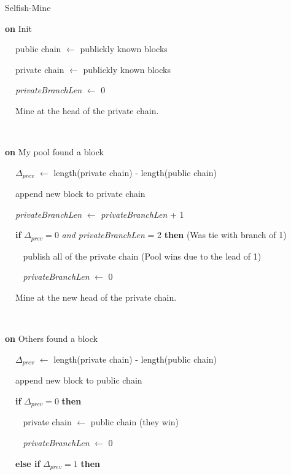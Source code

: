 \documentclass[a4paper, 11pt]{article}
\begin{document}
\begin{CJK*}{UTF8}{gbsn}
    \begin{algorithm}
        \caption{Selfish-Mine}
        \label{algorithm:selfishMine}

        \textbf{on} Init

            $\ \ \ \ $ public chain  $\leftarrow$ publickly known blocks

            $\ \ \ \ $ private chain $\leftarrow$ publickly known blocks

            $\ \ \ \ $ \textit{privateBranchLen} $\leftarrow$ 0

            $\ \ \ \ $ Mine at the head of the private chain.

        $ $
        
        \textbf{on} My pool found a block

            $\ \ \ \ $ $\Delta_{\textit{prev}}$ $\leftarrow$ length(private chain) - length(public chain)

            $\ \ \ \ $ append new block to private chain

            $\ \ \ \ $ \textit{privateBranchLen} $\leftarrow$ \textit{privateBranchLen} + 1

            $\ \ \ \ $ \textbf{if} $\Delta_{\textit{prev}} = 0$ \textit{and privateBranchLen} = 2 \textbf{then} \hfill (Was tie with branch of 1)

                $\ \ \ \ \ \ \ \ $ publish all of the private chain \hfill (Pool wins due to the lead of 1)

                $\ \ \ \ \ \ \ \ $ \textit{privateBranchLen} $\leftarrow$ 0
            
            $\ \ \ \ $ Mine at the new head of the private chain.
        
        $ $

        \textbf{on} Others found a block 

            $\ \ \ \ $ $\Delta_{\textit{prev}}$ $\leftarrow$ length(private chain) - length(public chain)
            
            $\ \ \ \ $ append new block to public chain 

            $\ \ \ \ $ \textbf{if} $\Delta_{\textit{prev}} = 0$ \textbf{then}

                $\ \ \ \ \ \ \ \ $ private chain $\leftarrow$ public chain \hfill (they win)

                $\ \ \ \ \ \ \ \ $ \textit{privateBranchLen} $\leftarrow$ 0
            
            $\ \ \ \ $ \textbf{else if} $\Delta_{\textit{prev}} = 1 $ \textbf{then}


\end{algorithm}
\end{CJK*}
\end{document}
